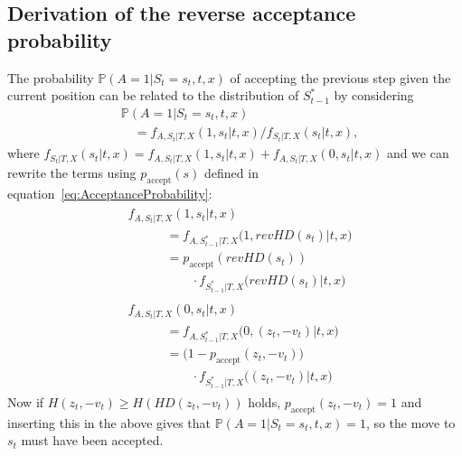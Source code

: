 \begin{appendices}

\section{Derivation of the reverse acceptance probability}
\label{app:DerivationOfReverseAcceptanceProbability}
The probability $\mathbb{P}(A = 1|S_t = s_t, t, x)$ of accepting the previous step given the current position can be related to the distribution of $S_{t-1}^*$ by considering
\begin{equation}
\begin{split}
&\mathbb{P}(A = 1|S_t = s_t, t, x) \\
&\quad= f_{A, S_t|T, X}(1, s_t| t, x)/f_{S_t|T, X}(s_t| t, x),
\end{split}
\end{equation}
where $f_{S_t|T, X}(s_t| t, x) = f_{A, S_t|T, X}(1, s_t| t, x) + f_{A, S_t|T, X}(0, s_t| t, x)$ and we can rewrite the terms using $p_\textrm{accept}(s)$ defined in equation~\eqref{eq:AcceptanceProbability}:
\begin{align}
\begin{split}
&f_{A, S_t|T, X}(1, s_t| t, x) \\
&\quad\qquad = f_{A, S_{t-1}^*|T, X}\big(1, revHD(s_t)| t, x\big) \\
&\quad\qquad = p_\textrm{accept}(revHD(s_t)) \\
&\quad\qquad\qquad \cdot f_{S^*_{t-1}|T, X}\big(revHD(s_t)| t, x\big)
\end{split} \\
\begin{split}
&f_{A, S_t|T, X}(0, s_t| t, x) \\
&\quad\qquad = f_{A, S_{t-1}^*|T, X}\big(0, (z_t, -v_t)| t, x\big) \\
&\quad\qquad = \big(1 - p_\textrm{accept}(z_t, -v_t)\big) \\
&\quad\qquad\qquad \cdot f_{S^*_{t-1}|T, X}\big((z_t, -v_t)| t, x\big)
\end{split}
\end{align}
Now if $H(z_t, -v_t) \geq H(HD(z_t, -v_t))$ holds, $p_\textrm{accept}(z_t, -v_t) = 1$ and inserting this in the above gives that $\mathbb{P}(A = 1|S_t = s_t, t, x) = 1$, so the move to $s_t$ must have been accepted.


\end{appendices}
